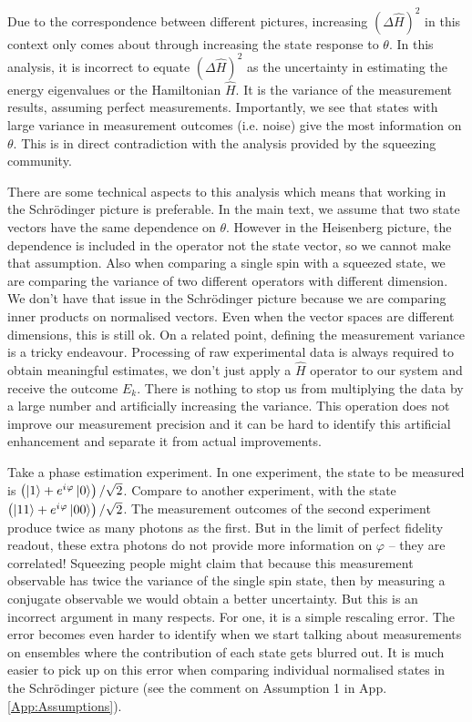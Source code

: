 \documentclass[reqno]{amsart}
\newcommand{\ket}[1]{\left| #1 \right>}
\newcommand{\hham}{\hat{H}}
\newcommand{\iu}{{i\mkern1mu}}
\begin{document}
Due to the correspondence between different pictures, increasing $\left(\Delta \hham\right)^2$ in this context only comes about through increasing the state response to $\theta$. In this analysis, it is incorrect to equate $\left(\Delta \hham\right)^2$ as the uncertainty in estimating the energy eigenvalues or the Hamiltonian $\hham$. It is the variance of the measurement results, assuming perfect measurements. Importantly, we see that states with large variance in measurement outcomes (i.e. noise) give the most information on $\theta$. This is in direct contradiction with the analysis provided by the squeezing community.

There are some technical aspects to this analysis which means that working in the Schr\"odinger picture is preferable. In the main text, we assume that two state vectors have the same dependence on $\theta$. However in the Heisenberg picture, the dependence is included in the operator not the state vector, so we cannot make that assumption. Also when comparing a single spin with a squeezed state, we are comparing the variance of two different operators with different dimension. We don't have that issue in the Schr\"odinger picture because we are comparing inner products on normalised vectors. Even when the vector spaces are different dimensions, this is still ok. On a related point, defining the measurement variance is a tricky endeavour. Processing of raw experimental data is always required to obtain meaningful estimates, we don't just apply a $\hham$ operator to our system and receive the outcome $E_k$. There is nothing to stop us from multiplying the data by a large number and artificially increasing the variance. This operation does not improve our measurement precision and it can be hard to identify this artificial enhancement and separate it from actual improvements. 

Take a phase estimation experiment. In one experiment, the state to be measured is $\left(\ket{1} + e^{\iu \varphi}\ket{0}\right)/\sqrt{2}$. Compare to another experiment, with the state $\left(\ket{1 1}+ e^{\iu \varphi}\ket{0 0}\right)/\sqrt{2}$. The measurement outcomes of the second experiment produce twice as many photons as the first. But in the limit of perfect fidelity readout, these extra photons do not provide more information on $\varphi$ -- they are correlated! Squeezing people might claim that because this measurement observable has twice the variance of the single spin state, then by measuring a conjugate observable we would obtain a better uncertainty. But this is an incorrect argument in many respects. For one, it is a simple rescaling error. The error becomes even harder to identify when we start talking about measurements on ensembles where the contribution of each state gets blurred out. It is much easier to pick up on this error when comparing individual normalised states in the Schr\"odinger picture (see the comment on Assumption 1 in App.\,\ref{App:Assumptions}). 
\\
\end{document}
